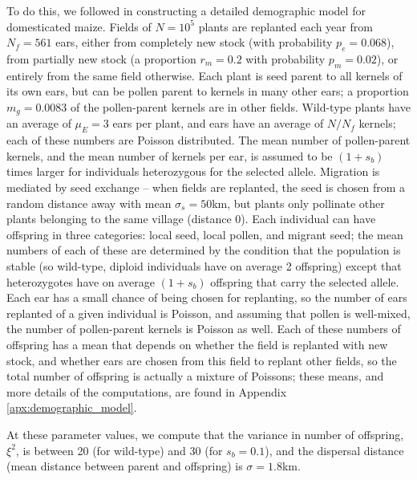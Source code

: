 To do this,
we followed \citet{vanHeerwaarden2010} in constructing a detailed demographic model for domesticated maize.
Fields of $N=10^5$ plants are replanted each year from $N_f=561$ ears,
either from completely new stock (with probability $p_e=0.068$),
from partially new stock (a proportion $r_m=0.2$ with probability $p_m=0.02$),
or entirely from the same field otherwise.
Each plant is seed parent to all kernels of its own ears, but can be pollen parent to kernels in many other ears;
a proportion $m_g=0.0083$ of the pollen-parent kernels are in other fields.
Wild-type plants have an average of $\mu_E=3$ ears per plant, and ears have an average of $N/N_f$ kernels;
each of these numbers are Poisson distributed.
The mean number of pollen-parent kernels, and the mean number of kernels per ear, 
is assumed to be $(1+s_b)$ times larger for individuals heterozygous for the selected allele.
Migration is mediated by seed exchange --
when fields are replanted, the seed is chosen from a random distance away with mean $\sigma_s=50$km,
but plants only pollinate other plants belonging to the same village (distance 0).
Each individual can have offspring in three categories: local seed, local pollen, and migrant seed;
the mean numbers of each of these are determined by the condition that the population is stable
(so wild-type, diploid individuals have on average 2 offspring)
except that heterozygotes have on average $(1+s_b)$ offspring that carry the selected allele.
Each ear has a small chance of being chosen for replanting,
so the number of ears replanted of a given individual is Poisson,
and assuming that pollen is well-mixed, the number of pollen-parent kernels is Poisson as well.
Each of these numbers of offspring has a mean that depends on whether the field is replanted with new stock,
and whether ears are chosen from this field to replant other fields,
so the total number of offspring is actually a mixture of Poissons;
these means, and more details of the computations, are found in Appendix \ref{apx:demographic_model}.


At these parameter values, we compute that the variance in number of offspring, $\xi^2$, is between 20 (for wild-type) and 30 (for $s_b=0.1$), 
and the dispersal distance (mean distance between parent and offspring)
is $\sigma=1.8$km.

